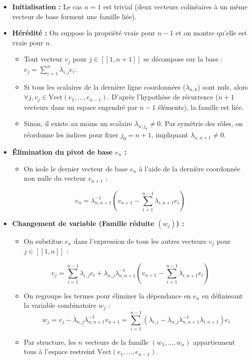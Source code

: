 \documentclass[11pt, a4paper]{article}
\theoremstyle{definition}
\begin{document}
\begin{itemize}
\item \textbf{Initialisation :} Le cas $n=1$ est trivial (deux vecteurs colinéaires à un même vecteur de base forment une famille liée).
\item \textbf{Hérédité :} On suppose la propriété vraie pour $n-1$ et on montre qu'elle est vraie pour $n$.
\begin{itemize}
\item Tout vecteur $v_j$ pour $j \in [\![1, n+1]\!]$ se décompose sur la base : $v_j = \sum_{i=1}^n \lambda_{i,j}e_i$.
\item Si tous les scalaires de la dernière ligne coordonnées ($\lambda_{n,k}$) sont nuls, alors $\forall j, v_j \in \mathrm{Vect}(e_1,\dots,e_{n-1})$. D'après l'hypothèse de récurrence ($n+1$ vecteurs dans un espace engendré par $n-1$ éléments), la famille est liée.
\item Sinon, il existe au moins un scalaire $\lambda_{n,j_0} \neq 0$. Par symétrie des rôles, on réordonne les indices pour fixer $j_0 = n+1$, impliquant $\lambda_{n,n+1} \neq 0$.
\end{itemize}
\item \textbf{Élimination du pivot de base $e_n$ :}
\begin{itemize}
\item On isole le dernier vecteur de base $e_n$ à l'aide de la dernière coordonnée non nulle du vecteur $v_{n+1}$ :
\end{itemize}
\[
e_n = \lambda_{n,n+1}^{-1} \left( v_{n+1} - \sum_{i=1}^{n-1} \lambda_{i,n+1} e_i \right)
\]
\item \textbf{Changement de variable (Famille réduite $(w_j)$) :}
\begin{itemize}
\item On substitue $e_n$ dans l'expression de tous les autres vecteurs $v_j$ pour $j \in [\![1, n]\!]$ :
\end{itemize}
\[
v_j = \sum_{i=1}^{n-1} \lambda_{i,j} e_i + \lambda_{n,j} \lambda_{n,n+1}^{-1} \left( v_{n+1} - \sum_{i=1}^{n-1} \lambda_{i,n+1} e_i \right)
\]
\begin{itemize}
\item On regroupe les termes pour éliminer la dépendance en $e_n$ en définissant la variable combinatoire $w_j$ :
\[
w_j = v_j - \lambda_{n,j} \lambda_{n,n+1}^{-1} v_{n+1} = \sum_{i=1}^{n-1} \left( \lambda_{i,j} - \lambda_{n,j}\lambda_{n,n+1}^{-1}\lambda_{i,n+1} \right) e_i
\]
\item Par structure, les $n$ vecteurs de la famille $(w_1, \dots, w_n)$ appartiennent tous à l'espace restreint $\mathrm{Vect}(e_1, \dots, e_{n-1})$.

\end{itemize}
\end{itemize}
\end{document}
